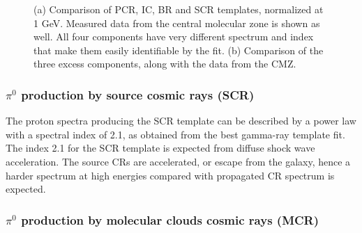 \begin{figure}[h]
\begin{minipage}[h]{0.45\textwidth}
 	  \subcaption{}
 	  \label{fig:norm_excess_component}
  \end{minipage}
  \caption{(a) Comparison of PCR, IC, BR and SCR templates, normalized at 1 GeV. Measured data from the central molecular zone is shown as well. All four components have very different spectrum and index that make them easily identifiable by the fit. (b) Comparison of the three excess components, along with the data from the CMZ.}
  \label{fig:norm_spectra} 
\end{figure}




%

\subsubsection{$\pi^0$ production by source cosmic rays (SCR)}

The proton spectra producing the SCR template can be described by a power law with a spectral index of 2.1, as obtained from the best gamma-ray template fit. The index 2.1 for the SCR template %
is expected from diffuse shock wave acceleration.  
The source CRs are accelerated, or escape from the galaxy, hence a harder spectrum at high energies compared with propagated CR spectrum is expected.


\subsubsection{$\pi^0$ production by molecular clouds cosmic rays (MCR)}

